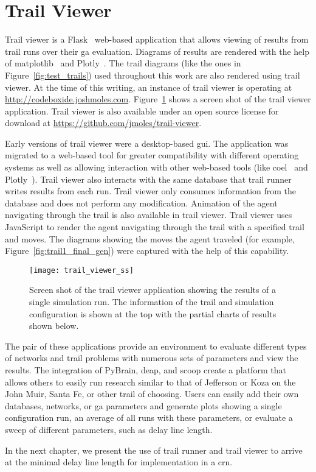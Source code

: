 \section{Trail Viewer}
Trail viewer is a Flask~\cite{Ronacher2010-mn} web-based application that allows viewing of results from trail runs over their \gls{ga} evaluation. Diagrams of results are rendered with the help of matplotlib~\cite{Hunter2007-yc} and Plotly~\cite{Plotly2012-po}. The trail diagrams (like the ones in Figure~\ref{fig:test_trails}) used throughout this work are also rendered using trail viewer. At the time of this writing, an instance of trail viewer is operating at \url{http://codeboxide.joshmoles.com}. Figure~\ref{fig:trail_viewer_ss} shows a screen shot of the trail viewer application. Trail viewer is also available under an open source license for download at \url{https://github.com/jmoles/trail-viewer}.

Early versions of trail viewer were a desktop-based \gls{gui}. The application was migrated to a web-based tool for greater compatibility with different operating systems as well as allowing interaction with other web-based tools (like \gls{coel}~\cite{Banda2014-qw} and Plotly~\cite{Plotly2012-po}). Trail viewer also interacts with the same database that trail runner writes results from each run. Trail viewer only consumes information from the database and does not perform any modification. Animation of the agent navigating through the trail is also available in trail viewer. Trail viewer uses JavaScript to render the agent navigating through the trail with a specified trail and moves. The diagrams showing the moves the agent traveled (for example, Figure~\ref{fig:trail1_final_gen}) were captured with the help of this capability.

\begin{figure}
\centering
\texttt{[image: trail\_viewer\_ss]}
\caption[Screen Shot of Trail Viewer]{Screen shot of the trail viewer application showing the results of a single simulation run. The information of the trail and simulation configuration is shown at the top with the partial charts of results shown below.}
\label{fig:trail_viewer_ss}
\end{figure}

The pair of these applications provide an environment to evaluate different types of networks and trail problems with numerous sets of parameters and view the results. The integration of PyBrain, \gls{deap}, and \gls{scoop} create a platform that allows others to easily run research similar to that of Jefferson or Koza on the John Muir, Santa Fe, or other trail of choosing. Users can easily add their own databases, networks, or \gls{ga} parameters and generate plots showing a single configuration run, an average of all runs with these parameters, or evaluate a sweep of different parameters, such as delay line length.

In the next chapter, we present the use of trail runner and trail viewer to arrive at the minimal delay line length for implementation in a \gls{crn}.